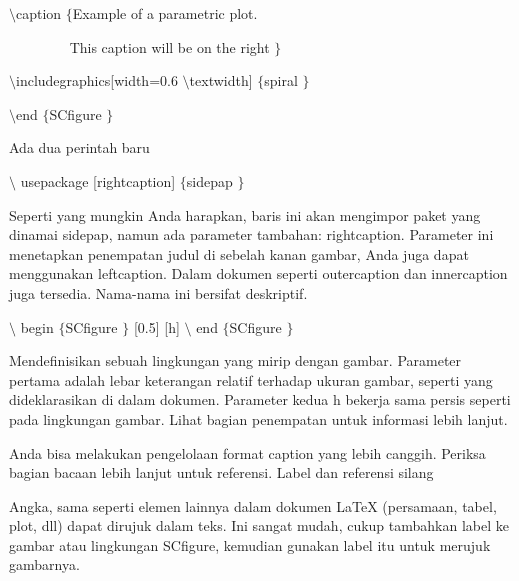 \vspace{12pt}
\noindent 
 $  \setminus $caption $  \{  $Example of a parametric plot. \par
\noindent 
  \par
\noindent 
~~~~~~~~ This caption will be on the right $  \}  $ \par
\vspace{12pt}
\noindent 
 $  \setminus $includegraphics[width=0.6 $  \setminus $textwidth] $  \{  $spiral $  \}  $ \par
\vspace{12pt}
\noindent 
 $  \setminus $end $  \{  $SCfigure $  \}  $ \par
\vspace{16pt}
\vspace{16pt}
\noindent 
Ada dua perintah baru \par
\vspace{12pt}
\noindent 
 $  \setminus $ usepackage [rightcaption]  $  \{  $sidepap $  \}  $ \par
\noindent 
Seperti yang mungkin Anda harapkan, baris ini akan mengimpor paket yang dinamai sidepap, namun ada parameter tambahan: rightcaption. Parameter ini menetapkan penempatan judul di sebelah kanan gambar, Anda juga dapat menggunakan leftcaption. Dalam dokumen seperti outercaption dan innercaption juga tersedia. Nama-nama ini bersifat deskriptif. \par
\vspace{12pt}
\noindent 
 $  \setminus $ begin  $  \{  $SCfigure $  \}  $ [0.5] [h]  $  \setminus $ end  $  \{  $SCfigure $  \}  $ \par
\noindent 
Mendefinisikan sebuah lingkungan yang mirip dengan gambar. Parameter pertama adalah lebar keterangan relatif terhadap ukuran gambar, seperti yang dideklarasikan di dalam dokumen. Parameter kedua h bekerja sama persis seperti pada lingkungan gambar. Lihat bagian penempatan untuk informasi lebih lanjut. \par
\vspace{12pt}
\noindent 
Anda bisa melakukan pengelolaan format caption yang lebih canggih. Periksa bagian bacaan lebih lanjut untuk referensi. Label dan referensi silang \par
\vspace{12pt}
\noindent 
Angka, sama seperti elemen lainnya dalam dokumen LaTeX (persamaan, tabel, plot, dll) dapat dirujuk dalam teks. Ini sangat mudah, cukup tambahkan label ke gambar atau lingkungan SCfigure, kemudian gunakan label itu untuk merujuk gambarnya. \par
